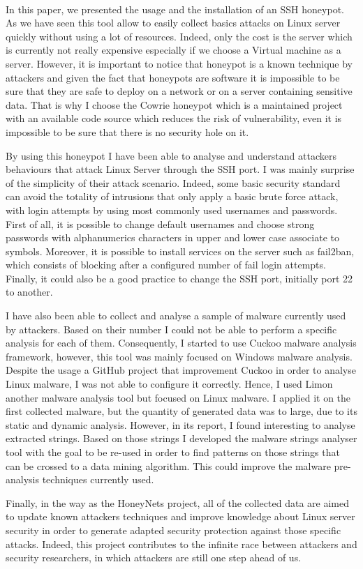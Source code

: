 \paragraph{}

In this paper, we presented the usage and the installation of an SSH honeypot. As we have 
seen this tool allow to easily collect basics attacks on Linux server quickly without
using a lot of resources. Indeed, only the cost is the server which is currently not really
expensive especially if we choose a Virtual machine as a server.
However, it is important to notice that honeypot is a known technique by attackers and
given the fact that honeypots are software it is impossible to be sure that they are safe
to deploy on a network or on a server containing sensitive data. That is why I choose the
Cowrie honeypot which is a maintained project with an available code source which reduces 
the risk of vulnerability, even it is impossible to be sure that there is no security hole
on it.

By using this honeypot I have been able to analyse and understand attackers behaviours that
attack Linux Server through the SSH port. I was mainly surprise of the simplicity of their
attack scenario. Indeed, some basic security standard can avoid the totality of intrusions
that only apply a basic brute force attack, with login attempts by using most commonly used
usernames and passwords. First of all, it is possible to change default usernames and choose
strong passwords with alphanumerics characters in upper and lower case associate to symbols.
Moreover, it is possible to install services on the server such as fail2ban, which consists
of blocking after a configured number of fail login attempts. Finally, it could also be a good
practice to change the SSH port, initially port 22 to another.

I have also been able to collect and analyse a sample of malware currently used by attackers.
Based on their number I could not be able to perform a specific analysis for each of them.
Consequently, I started to use Cuckoo malware analysis framework, however, this tool was
mainly focused on Windows malware analysis. Despite the usage a GitHub project that 
improvement Cuckoo in order to analyse Linux malware, I was not able to configure it correctly.
Hence, I used Limon another malware analysis tool but focused on Linux malware. I applied
it on the first collected malware, but the quantity of generated data was to large, due
to its static and dynamic analysis. However, in its report, I found interesting to analyse
extracted strings.
Based on those strings I developed the malware strings analyser tool with the goal to be 
re-used in order to find patterns on those strings that can be crossed to a data mining 
algorithm. This could improve the malware pre-analysis techniques currently used.

Finally, in the way as the HoneyNets project, all of the collected data are aimed to update
known attackers techniques and improve knowledge about Linux server security in order
to generate adapted security protection against those specific attacks.
Indeed, this project contributes to the infinite race between attackers and security researchers,
in which attackers are still one step ahead of us.

